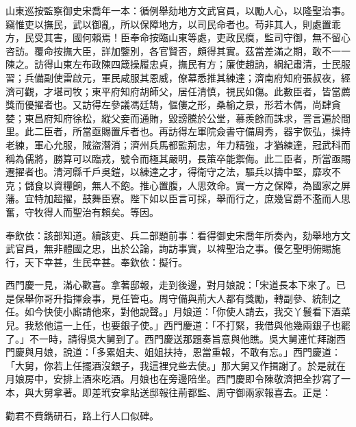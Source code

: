 \begin{showcontents}{}
山東巡按監察御史宋喬年一本：循例舉劾地方文武官員，以勵人心，以隆聖治事。竊惟吏以撫民，武以御亂，所以保障地方，以司民命者也。苟非其人，則處置乖方，民受其害，國何賴焉！臣奉命按臨山東等處，吏政民瘼，監司守御，無不留心咨訪。覆命按撫大臣，詳加鑒別，各官賢否，頗得其實。茲當差滿之期，敢不一一陳之。訪得山東左布政陳四箴操履忠貞，撫民有方；廉使趙訥，綱紀肅清，士民服習；兵備副使雷啟元，軍民咸服其恩威，僚幕悉推其練達；濟南府知府張叔夜，經濟可觀，才堪司牧；東平府知府胡師父，居任清慎，視民如傷。此數臣者，皆當薦獎而優擢者也。又訪得左參議馮廷鵠，傴僂之形，桑榆之景，形若木偶，尚肆貪婪；東昌府知府徐松，縱父妾而通賄，毀謗騰於公堂，慕羨餘而誅求，詈言遍於間里。此二臣者，所當亟賜置斥者也。再訪得左軍院僉書守備周秀，器宇恢弘，操持老練，軍心允服，賊盜潛消；濟州兵馬都監荊忠，年力精強，才猶練達，冠武科而稱為儒將，勝算可以臨戎，號令而極其嚴明，長策卒能禦侮。此二臣者，所當亟賜遷擢者也。清河縣千戶吳鎧，以練達之才，得衛守之法，驅兵以擣中堅，靡攻不克；儲食以資糧餉，無人不飽。推心置腹，人思效命。實一方之保障，為國家之屏藩。宜特加超擢，鼓舞臣寮。陛下如以臣言可採，舉而行之，庶幾官爵不濫而人思奮，守牧得人而聖治有賴矣。等因。

奉飲依：該部知道。續該吏、兵二部題前事：看得御史宋喬年所奏內，劾舉地方文武官員，無非體國之忠，出於公論，詢訪事實，以裨聖治之事。優乞聖明俯賜施行，天下幸甚，生民幸甚。奉欽依：擬行。

西門慶一見，滿心歡喜。拿著邸報，走到後邊，對月娘說：「宋道長本下來了。已是保舉你哥升指揮僉事，見任管屯。周守備與荊大人都有獎勵，轉副參、統制之任。如今快使小廝請他來，對他說聲。」月娘道：「你使人請去，我交丫鬟看下酒菜兒。我愁他這一上任，也要銀子使。」西門慶道：「不打緊，我借與他幾兩銀子也罷了。」不一時，請得吳大舅到了。西門慶送那題奏旨意與他瞧。吳大舅連忙拜謝西門慶與月娘，說道：「多累姐夫、姐姐扶持，恩當重報，不敢有忘。」西門慶道：「大舅，你若上任擺酒沒銀子，我這裡兌些去使。」那大舅又作揖謝了。於是就在月娘房中，安排上酒來吃酒。月娘也在旁邊陪坐。西門慶即令陳敬濟把全抄寫了一本，與大舅拿著。即差玳安拿貼送邸報往荊都監、周守御兩家報喜去。正是：

勸君不費鐫研石，路上行人口似碑。


\end{showcontents}


